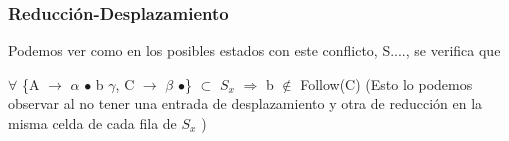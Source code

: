 \documentclass[a4paper, 12pt]{article}
\begin{document}
	\subsubsection*{Reducción-Desplazamiento}
	Podemos ver como en los posibles estados con este conflicto, S...., se verifica que 
	
	$\forall$ \{A $\rightarrow$ $\alpha$ $\bullet$ b $\gamma$, C $\rightarrow$ $\beta$ $\bullet$\} $\subset$ $S_x$ $\Rightarrow$ b $\notin$ Follow(C) (Esto lo podemos observar al no tener una entrada de desplazamiento y otra de reducción en la misma celda de cada fila de $S_x$ )


\begin{table}[htbp]
\centering
 \hspace*{-1.5cm} 
 \begin{turn}{90}
\end{turn}
\end{table}
\end{document}
